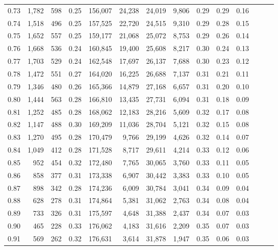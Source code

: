 \begin{tabular}{rrrrrrrrrrrrrr}
0.73 &  1,782 &  598 &  0.25 &  156,007 &   24,238 &  24,019 &   9,806 &  0.29 &  0.29 &      0.16 \\
0.74 &  1,518 &  496 &  0.25 &  157,525 &   22,720 &  24,515 &   9,310 &  0.29 &  0.28 &      0.15 \\
0.75 &  1,652 &  557 &  0.25 &  159,177 &   21,068 &  25,072 &   8,753 &  0.29 &  0.26 &      0.14 \\
0.76 &  1,668 &  536 &  0.24 &  160,845 &   19,400 &  25,608 &   8,217 &  0.30 &  0.24 &      0.13 \\
0.77 &  1,703 &  529 &  0.24 &  162,548 &   17,697 &  26,137 &   7,688 &  0.30 &  0.23 &      0.12 \\
0.78 &  1,472 &  551 &  0.27 &  164,020 &   16,225 &  26,688 &   7,137 &  0.31 &  0.21 &      0.11 \\
0.79 &  1,346 &  480 &  0.26 &  165,366 &   14,879 &  27,168 &   6,657 &  0.31 &  0.20 &      0.10 \\
0.80 &  1,444 &  563 &  0.28 &  166,810 &   13,435 &  27,731 &   6,094 &  0.31 &  0.18 &      0.09 \\
0.81 &  1,252 &  485 &  0.28 &  168,062 &   12,183 &  28,216 &   5,609 &  0.32 &  0.17 &      0.08 \\
0.82 &  1,147 &  488 &  0.30 &  169,209 &   11,036 &  28,704 &   5,121 &  0.32 &  0.15 &      0.08 \\
0.83 &  1,270 &  495 &  0.28 &  170,479 &    9,766 &  29,199 &   4,626 &  0.32 &  0.14 &      0.07 \\
0.84 &  1,049 &  412 &  0.28 &  171,528 &    8,717 &  29,611 &   4,214 &  0.33 &  0.12 &      0.06 \\
0.85 &    952 &  454 &  0.32 &  172,480 &    7,765 &  30,065 &   3,760 &  0.33 &  0.11 &      0.05 \\
0.86 &    858 &  377 &  0.31 &  173,338 &    6,907 &  30,442 &   3,383 &  0.33 &  0.10 &      0.05 \\
0.87 &    898 &  342 &  0.28 &  174,236 &    6,009 &  30,784 &   3,041 &  0.34 &  0.09 &      0.04 \\
0.88 &    628 &  278 &  0.31 &  174,864 &    5,381 &  31,062 &   2,763 &  0.34 &  0.08 &      0.04 \\
0.89 &    733 &  326 &  0.31 &  175,597 &    4,648 &  31,388 &   2,437 &  0.34 &  0.07 &      0.03 \\
0.90 &    465 &  228 &  0.33 &  176,062 &    4,183 &  31,616 &   2,209 &  0.35 &  0.07 &      0.03 \\
0.91 &    569 &  262 &  0.32 &  176,631 &    3,614 &  31,878 &   1,947 &  0.35 &  0.06 &      0.03 \\

\end{tabular}
